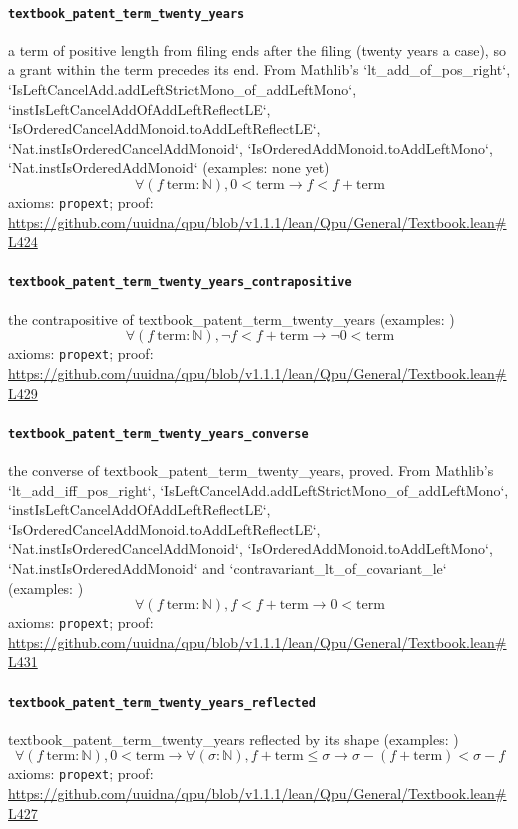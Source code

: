 \documentclass[11pt]{article}
\begin{document}
\paragraph{\texttt{textbook\_patent\_term\_twenty\_years}}
a term of positive length from filing ends after the filing (twenty years a case), so a grant within the term precedes its end. From Mathlib's `lt\_add\_of\_pos\_right`, `IsLeftCancelAdd.addLeftStrictMono\_of\_addLeftMono`, `instIsLeftCancelAddOfAddLeftReflectLE`, `IsOrderedCancelAddMonoid.toAddLeftReflectLE`, `Nat.instIsOrderedCancelAddMonoid`, `IsOrderedAddMonoid.toAddLeftMono`, `Nat.instIsOrderedAddMonoid` (examples: none yet)
\[ \forall (f\ \mathrm{term} : \mathbb{N}), 0 < \mathrm{term} \to f < f + \mathrm{term} \]
\noindent axioms: \texttt{propext}; proof: \url{https://github.com/uuidna/qpu/blob/v1.1.1/lean/Qpu/General/Textbook.lean\#L424}

\paragraph{\texttt{textbook\_patent\_term\_twenty\_years\_contrapositive}}
the contrapositive of textbook\_patent\_term\_twenty\_years (examples: )
\[ \forall (f\ \mathrm{term} : \mathbb{N}), \neg f < f + \mathrm{term} \to \neg 0 < \mathrm{term} \]
\noindent axioms: \texttt{propext}; proof: \url{https://github.com/uuidna/qpu/blob/v1.1.1/lean/Qpu/General/Textbook.lean\#L429}

\paragraph{\texttt{textbook\_patent\_term\_twenty\_years\_converse}}
the converse of textbook\_patent\_term\_twenty\_years, proved. From Mathlib's `lt\_add\_iff\_pos\_right`, `IsLeftCancelAdd.addLeftStrictMono\_of\_addLeftMono`, `instIsLeftCancelAddOfAddLeftReflectLE`, `IsOrderedCancelAddMonoid.toAddLeftReflectLE`, `Nat.instIsOrderedCancelAddMonoid`, `IsOrderedAddMonoid.toAddLeftMono`, `Nat.instIsOrderedAddMonoid` and `contravariant\_lt\_of\_covariant\_le` (examples: )
\[ \forall (f\ \mathrm{term} : \mathbb{N}), f < f + \mathrm{term} \to 0 < \mathrm{term} \]
\noindent axioms: \texttt{propext}; proof: \url{https://github.com/uuidna/qpu/blob/v1.1.1/lean/Qpu/General/Textbook.lean\#L431}

\paragraph{\texttt{textbook\_patent\_term\_twenty\_years\_reflected}}
textbook\_patent\_term\_twenty\_years reflected by its shape (examples: )
\[ \forall (f\ \mathrm{term} : \mathbb{N}), 0 < \mathrm{term} \to \forall (\sigma : \mathbb{N}), f + \mathrm{term} \le \sigma \to \sigma - (f + \mathrm{term}) < \sigma - f \]
\noindent axioms: \texttt{propext}; proof: \url{https://github.com/uuidna/qpu/blob/v1.1.1/lean/Qpu/General/Textbook.lean\#L427}
\end{document}
